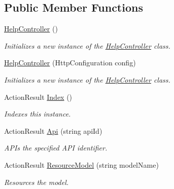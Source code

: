 \subsection*{Public Member Functions}
\begin{DoxyCompactItemize}
\item 
\hyperlink{class_open_1_1_g_i_1_1hypermart_1_1_areas_1_1_help_page_1_1_controllers_1_1_help_controller_afa0b9b820c64c6b4f58818ea7a8fbee9}{Help\+Controller} ()
\begin{DoxyCompactList}\small\item\em Initializes a new instance of the \hyperlink{class_open_1_1_g_i_1_1hypermart_1_1_areas_1_1_help_page_1_1_controllers_1_1_help_controller}{Help\+Controller} class. \end{DoxyCompactList}\item 
\hyperlink{class_open_1_1_g_i_1_1hypermart_1_1_areas_1_1_help_page_1_1_controllers_1_1_help_controller_a5701fb0613147c92bcf47b40636fbb4c}{Help\+Controller} (Http\+Configuration config)
\begin{DoxyCompactList}\small\item\em Initializes a new instance of the \hyperlink{class_open_1_1_g_i_1_1hypermart_1_1_areas_1_1_help_page_1_1_controllers_1_1_help_controller}{Help\+Controller} class. \end{DoxyCompactList}\item 
Action\+Result \hyperlink{class_open_1_1_g_i_1_1hypermart_1_1_areas_1_1_help_page_1_1_controllers_1_1_help_controller_a4c63414e59364e8ce99be20a5c909da8}{Index} ()
\begin{DoxyCompactList}\small\item\em Indexes this instance. \end{DoxyCompactList}\item 
Action\+Result \hyperlink{class_open_1_1_g_i_1_1hypermart_1_1_areas_1_1_help_page_1_1_controllers_1_1_help_controller_a5f4e23a5d390343976a5b04f7a3e9344}{Api} (string api\+Id)
\begin{DoxyCompactList}\small\item\em A\+P\+Is the specified A\+PI identifier. \end{DoxyCompactList}\item 
Action\+Result \hyperlink{class_open_1_1_g_i_1_1hypermart_1_1_areas_1_1_help_page_1_1_controllers_1_1_help_controller_a374c9c2d8d4630c433a397b3ac76c53c}{Resource\+Model} (string model\+Name)
\begin{DoxyCompactList}\small\item\em Resources the model. \end{DoxyCompactList}\end{DoxyCompactItemize}
